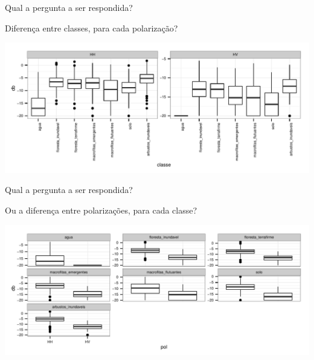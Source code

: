 \documentclass{beamer}\usepackage[]{graphicx}\usepackage[]{color}
\newenvironment{knitrout}{}{} %
\renewenvironment{knitrout}{\setlength{\topsep}{0mm}}{}
\begin{document}
\begin{frame}{Qual a pergunta a ser respondida?}

Diferença entre classes, para cada polarização?


\begin{knitrout}
\color{fgcolor}
\includegraphics[width=1.1\linewidth]{figure/unnamed-chunk-87-1} 

\end{knitrout}
\end{frame}


\begin{frame}{Qual a pergunta a ser respondida?}

Ou a diferença entre polarizações, para cada classe?


\begin{knitrout}
\color{fgcolor}
\includegraphics[width=1\linewidth]{figure/unnamed-chunk-88-1} 

\end{knitrout}
\end{frame}
\end{document}
